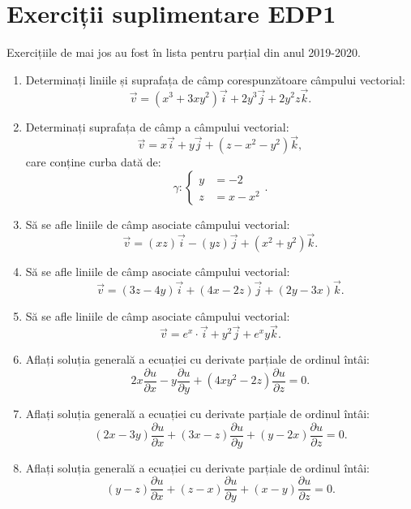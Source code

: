 \chapter{Exerciții suplimentare EDP1}

Exercițiile de mai jos au fost în lista pentru parțial din anul 2019-2020.

\begin{enumerate}

\item Determinați liniile și suprafața de câmp corespunzătoare câmpului vectorial:
  \[
    \vec{v} = (x^3 + 3xy^2)\vec{i} + 2y^3 \vec{j} + 2y^2z \vec{k}.
  \]

\item Determinați suprafața de câmp a câmpului vectorial:
  \[
    \vec{v} = x\vec{i} + y\vec{j} + (z - x^2 - y^2) \vec{k},
  \]
  care conține curba dată de:
  \[
    \gamma: \begin{cases} y &= -2 \\ z &= x - x^2 \end{cases}.
  \]

\item Să se afle liniile de câmp asociate câmpului vectorial:
  \[
    \vec{v}=(xz)\vec{i}-(yz)\vec{j}+(x^{2}+y^{2})\vec{k}.
  \]

\item Să se afle liniile de câmp asociate câmpului vectorial:
  \[
    \vec{v}=(3z-4y)\vec{i}+(4x-2z)\vec{j}+(2y-3x)\vec{k}.
  \]

\item Să se afle liniile de câmp asociate câmpului vectorial:
  \[
    \vec{v} = e^x \cdot \vec{i} + y^2 \vec{j} + e^x y \vec{k}.
  \]

\item Aflați soluția generală a ecuației cu derivate parțiale de
  ordinul întâi:
  \[
    2x \dfrac{\partial u}{\partial x} - y\dfrac{\partial u}{\partial y} + %
    (4xy^2 - 2z) \dfrac{\partial u}{\partial z} = 0.
  \]

\item Aflați soluția generală a ecuației cu derivate parțiale de
  ordinul întâi:
  \[
    (2x - 3y)\dfrac{\partial u}{\partial x} + (3x - z) \dfrac{\partial u}{\partial y} + %
    (y - 2x) \dfrac{\partial u}{\partial z} = 0.
  \]

\item Aflați soluția generală a ecuației cu derivate parțiale de
  ordinul întâi:
  \[
    (y - z) \dfrac{\partial u}{\partial x} + (z - x) \dfrac{\partial u}{\partial y} + %
    (x - y) \dfrac{\partial u}{\partial z} = 0.
  \]


\end{enumerate}

